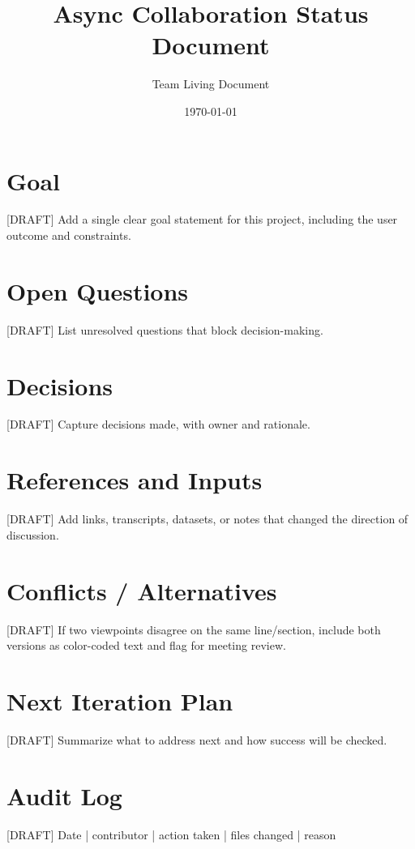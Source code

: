 \documentclass[11pt]{article}
\title{Async Collaboration Status Document}
\author{Team Living Document}
\date{\today}
\begin{document}
\maketitle

\section*{Goal}
\textcolor{jasonC}{[DRAFT] Add a single clear goal statement for this project, including the user outcome and constraints.}

\section*{Open Questions}
\textcolor{amyC}{[DRAFT] List unresolved questions that block decision-making.}

\section*{Decisions}
\textcolor{hayleyC}{[DRAFT] Capture decisions made, with owner and rationale.}

\section*{References and Inputs}
\textcolor{elizC}{[DRAFT] Add links, transcripts, datasets, or notes that changed the direction of discussion.}

\section*{Conflicts / Alternatives}
\textcolor{jasonC}{[DRAFT] If two viewpoints disagree on the same line/section, include both versions as color-coded text and flag for meeting review.}

\section*{Next Iteration Plan}
\textcolor{amyC}{[DRAFT] Summarize what to address next and how success will be checked.}

\section*{Audit Log}
\textcolor{hayleyC}{[DRAFT] Date | contributor | action taken | files changed | reason}
\end{document}
